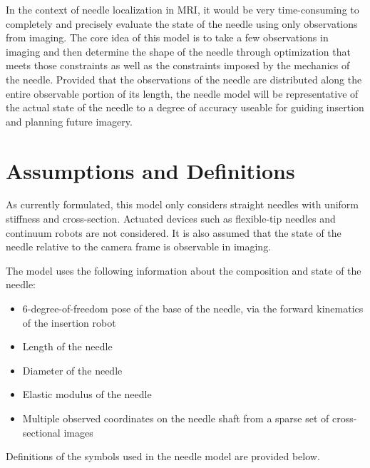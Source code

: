 In the context of needle localization in MRI, it would be very time-consuming to completely and precisely evaluate the state of the needle using only observations from imaging. The core idea of this model is to take a few observations in imaging and then determine the shape of the needle through optimization that meets those constraints as well as the constraints imposed by the mechanics of the needle. Provided that the observations of the needle are distributed along the entire observable portion of its length, the needle model will be representative of the actual state of the needle to a degree of accuracy useable for guiding insertion and planning future imagery.

\section{Assumptions and Definitions}
As currently formulated, this model only considers straight needles with uniform stiffness and cross-section. Actuated devices such as flexible-tip needles and continuum robots are not considered. It is also assumed that the state of the needle relative to the camera frame is observable in imaging.

The model uses the following information about the composition and state of the needle:

\begin{itemize}
\item 6-degree-of-freedom pose of the base of the needle, via the forward kinematics of the insertion robot
\item Length of the needle
\item Diameter of the needle
\item Elastic modulus of the needle
\item Multiple observed coordinates on the needle shaft from a sparse set of cross-sectional images
\end{itemize}

Definitions of the symbols used in the needle model are provided below.

